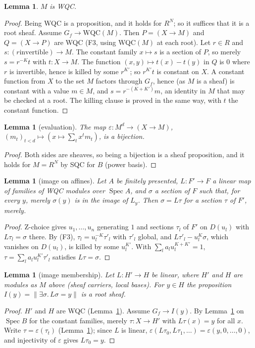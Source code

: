 \documentclass[11pt]{amsart}
\newtheorem{lemma}[theorem]{Lemma}
\theoremstyle{definition}
\theoremstyle{remark}
\newcommand{\Spec}{\operatorname{Spec}}
\newcommand{\tr}[1]{\|#1\|}
\begin{document}
\begin{lemma}\label{l:wqc}
$M$ is WQC.
\end{lemma}
\begin{proof}
Being WQC is a proposition, and it holds for $R^N$; so it suffices
that it is a root sheaf. Assume
$G_f\to\mathrm{WQC}(M)$. Then $P=(X\to M)$ and $Q=(X\to P)$ are WQC
(F3, using WQC$(M)$ at each root). Let $r\in R$ and $s:(r\text{
invertible})\to M$. The constant family $x\mapsto s$ is a section of $P$,
so merely $s=r^{-K}t$ with $t:X\to M$. The function
$(x,y)\mapsto t(x)-t(y)$ in $Q$ is $0$ where $r$ is invertible, hence is
killed by some $r^{K'}$; so $r^{K'}t$ is constant on $X$. A constant
function from $X$ to the set $M$ factors through $G_f$, hence (as $M$ is
a sheaf) is constant with a value $m\in M$, and $s=r^{-(K+K')}m$, an
identity in $M$ that may be checked at a root. The killing clause is
proved in the same way, with $t$ the constant function.
\end{proof}

\begin{lemma}[evaluation]\label{l:ev}
The map $\varepsilon:M^d\to(X\to M)$,
$(m_t)_{t<d}\mapsto(x\mapsto\sum_tx^tm_t)$, is a bijection.
\end{lemma}
\begin{proof}
Both sides are sheaves, so being a bijection is a sheaf proposition, and
it holds for $M=R^N$ by SQC for $B$ (power basis).
\end{proof}

\begin{lemma}[image on affines]\label{l:img}
Let $A$ be finitely presented, $L:F'\to F$ a linear map of families of WQC
modules over $\Spec A$, and $\sigma$ a section of $F$ such that, for every
$y$, merely $\sigma(y)$ is in the image of $L_y$. Then $\sigma=L\tau$ for a
section $\tau$ of $F'$, merely.
\end{lemma}
\begin{proof}
Z-choice gives $u_1,\dots,u_n$ generating $1$ and sections $\tau_l$ of
$F'$ on $D(u_l)$ with $L\tau_l=\sigma$ there. By (F3),
$\tau_l=u_l^{-K}\tau'_l$ with $\tau'_l$ global, and
$L\tau'_l-u_l^K\sigma$, which vanishes on $D(u_l)$, is killed by some
$u_l^{K'}$. With $\sum_la_lu_l^{K+K'}=1$, $\tau=\sum_la_lu_l^{K'}\tau'_l$
satisfies $L\tau=\sigma$.
\end{proof}

\begin{lemma}[image membership]\label{l:imgsheaf}
Let $L:H'\to H$ be linear, where $H'$ and $H$ are modules as $M$ above
(sheaf carriers, local bases). For $y\in H$ the proposition
$I(y)=\tr{\exists\sigma.\,L\sigma=y}$ is a root sheaf.
\end{lemma}
\begin{proof}
$H'$ and $H$ are WQC (Lemma~\ref{l:wqc}). Assume $G_f\to I(y)$. By
Lemma~\ref{l:img} on $\Spec B$ for the constant families, merely
$\tau:X\to H'$ with $L\tau(x)=y$ for all $x$. Write $\tau=\varepsilon(\tau_t)$
(Lemma~\ref{l:ev}); since $L$ is linear,
$\varepsilon(L\tau_0,L\tau_1,\dots)=\varepsilon(y,0,\dots,0)$, and
injectivity of $\varepsilon$ gives $L\tau_0=y$.
\end{proof}
\end{document}
